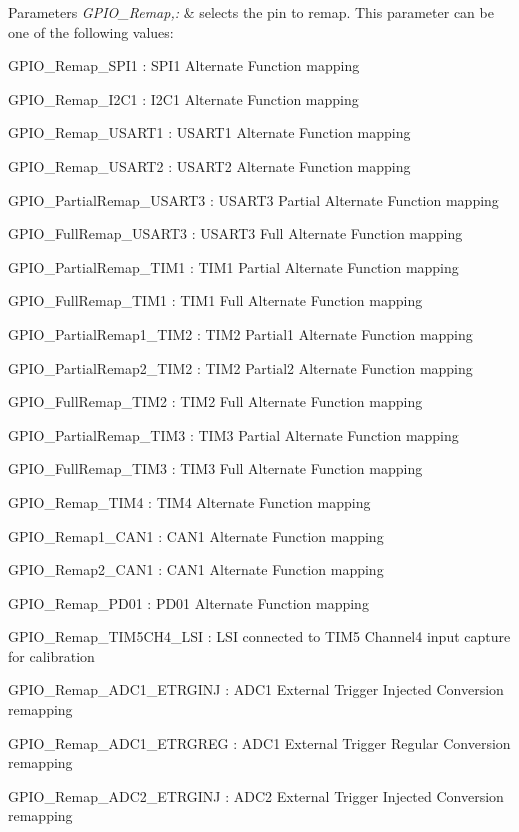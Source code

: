\begin{DoxyParams}{Parameters}
{\em G\-P\-I\-O\-\_\-\-Remap,\-:} & selects the pin to remap. This parameter can be one of the following values\-: \begin{DoxyItemize}
\item G\-P\-I\-O\-\_\-\-Remap\-\_\-\-S\-P\-I1 \-: S\-P\-I1 Alternate Function mapping \item G\-P\-I\-O\-\_\-\-Remap\-\_\-\-I2\-C1 \-: I2\-C1 Alternate Function mapping \item G\-P\-I\-O\-\_\-\-Remap\-\_\-\-U\-S\-A\-R\-T1 \-: U\-S\-A\-R\-T1 Alternate Function mapping \item G\-P\-I\-O\-\_\-\-Remap\-\_\-\-U\-S\-A\-R\-T2 \-: U\-S\-A\-R\-T2 Alternate Function mapping \item G\-P\-I\-O\-\_\-\-Partial\-Remap\-\_\-\-U\-S\-A\-R\-T3 \-: U\-S\-A\-R\-T3 Partial Alternate Function mapping \item G\-P\-I\-O\-\_\-\-Full\-Remap\-\_\-\-U\-S\-A\-R\-T3 \-: U\-S\-A\-R\-T3 Full Alternate Function mapping \item G\-P\-I\-O\-\_\-\-Partial\-Remap\-\_\-\-T\-I\-M1 \-: T\-I\-M1 Partial Alternate Function mapping \item G\-P\-I\-O\-\_\-\-Full\-Remap\-\_\-\-T\-I\-M1 \-: T\-I\-M1 Full Alternate Function mapping \item G\-P\-I\-O\-\_\-\-Partial\-Remap1\-\_\-\-T\-I\-M2 \-: T\-I\-M2 Partial1 Alternate Function mapping \item G\-P\-I\-O\-\_\-\-Partial\-Remap2\-\_\-\-T\-I\-M2 \-: T\-I\-M2 Partial2 Alternate Function mapping \item G\-P\-I\-O\-\_\-\-Full\-Remap\-\_\-\-T\-I\-M2 \-: T\-I\-M2 Full Alternate Function mapping \item G\-P\-I\-O\-\_\-\-Partial\-Remap\-\_\-\-T\-I\-M3 \-: T\-I\-M3 Partial Alternate Function mapping \item G\-P\-I\-O\-\_\-\-Full\-Remap\-\_\-\-T\-I\-M3 \-: T\-I\-M3 Full Alternate Function mapping \item G\-P\-I\-O\-\_\-\-Remap\-\_\-\-T\-I\-M4 \-: T\-I\-M4 Alternate Function mapping \item G\-P\-I\-O\-\_\-\-Remap1\-\_\-\-C\-A\-N1 \-: C\-A\-N1 Alternate Function mapping \item G\-P\-I\-O\-\_\-\-Remap2\-\_\-\-C\-A\-N1 \-: C\-A\-N1 Alternate Function mapping \item G\-P\-I\-O\-\_\-\-Remap\-\_\-\-P\-D01 \-: P\-D01 Alternate Function mapping \item G\-P\-I\-O\-\_\-\-Remap\-\_\-\-T\-I\-M5\-C\-H4\-\_\-\-L\-S\-I \-: L\-S\-I connected to T\-I\-M5 Channel4 input capture for calibration \item G\-P\-I\-O\-\_\-\-Remap\-\_\-\-A\-D\-C1\-\_\-\-E\-T\-R\-G\-I\-N\-J \-: A\-D\-C1 External Trigger Injected Conversion remapping \item G\-P\-I\-O\-\_\-\-Remap\-\_\-\-A\-D\-C1\-\_\-\-E\-T\-R\-G\-R\-E\-G \-: A\-D\-C1 External Trigger Regular Conversion remapping \item G\-P\-I\-O\-\_\-\-Remap\-\_\-\-A\-D\-C2\-\_\-\-E\-T\-R\-G\-I\-N\-J \-: A\-D\-C2 External Trigger Injected Conversion remapping 
\end{DoxyItemize}
\end{DoxyParams}
